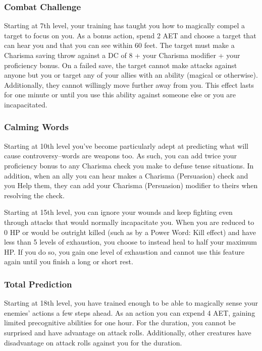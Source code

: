 \subsubsection{Combat Challenge}
Starting at 7th level, your training has taught you how to magically compel a target to focus on you. As a bonus action, spend 2 AET and choose a target that can hear you and that you can see within 60 feet. The target must make a Charisma saving throw against a DC of 8 + your Charisma modifier + your proficiency bonus. On a failed save, the target cannot make attacks against anyone but you or target any of your allies with an ability (magical or otherwise). Additionally, they cannot willingly move further away from you. This effect lasts for one minute or until you use this ability against someone else or you are incapacitated.

\subsubsection{Calming Words}
Starting at 10th level you've become particularly adept at predicting what will cause controversy--words are weapons too. As such, you can add twice your proficiency bonus to any Charisma check you make to defuse tense situations. In addition, when an ally you can hear makes a Charisma (Persuasion) check and you Help them, they can add your Charisma (Persuasion) modifier to theirs when resolving the check.

Starting at 15th level, you can ignore your wounds and keep fighting even through attacks that would normally incapacitate you. When you are reduced to 0 HP or would be outright killed (such as by a Power Word: Kill effect) and have less than 5 levels of exhaustion, you choose to instead heal to half your maximum HP. If you do so, you gain one level of exhaustion and cannot use this feature again until you finish a long or short rest.

\subsubsection{Total Prediction}
Starting at 18th level, you have trained enough to be able to magically sense your enemies' actions a few steps ahead. As an action you can expend 4 AET, gaining limited precognitive abilities for one hour. For the duration, you cannot be surprised and have advantage on attack rolls. Additionally, other creatures have disadvantage on attack rolls against you for the duration.

